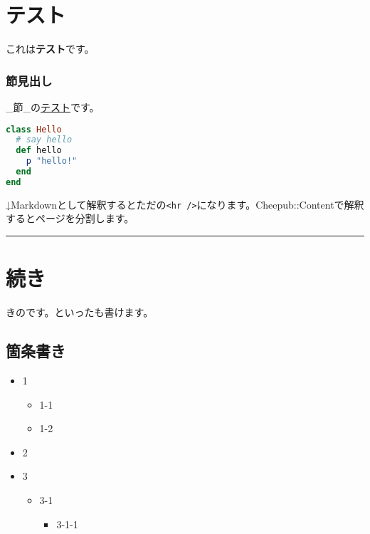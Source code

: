 \section{テスト}\hypertarget{テスト}{}\label{テスト}

これは\textbf{テスト}です。

\subsubsection{節見出し}\hypertarget{節見出し}{}\label{節見出し}

\_節\_の\href{https://example.jp/}{テスト}です。

\begin{lstlisting}[showspaces=false,showtabs=false,language=ruby,basicstyle=\ttfamily\footnotesize,columns=fixed,frame=tlbr]
class Hello
  # say hello
  def hello
    p "hello!"
  end
end

\end{lstlisting}   %



↓Markdownとして解釈するとただの\texttt{\textless{}hr /\textgreater{}}になります。Cheepub::Contentで解釈するとページを分割します。

\begin{center}
\rule{3in}{0.4pt}
\end{center}

\section{続き}\hypertarget{続き}{}\label{続き}

きのです。といったも書けます。

\subsection{箇条書き}\hypertarget{箇条書き}{}\label{箇条書き}

\begin{itemize}
\item{} 1


\begin{itemize}
\item{} 1-1
\item{} 1-2
\end{itemize}
\item{} 2
\item{} 3


\begin{itemize}
\item{} 3-1


\begin{itemize}
\item{} 3-1-1
\end{itemize}
\end{itemize}
\end{itemize}

